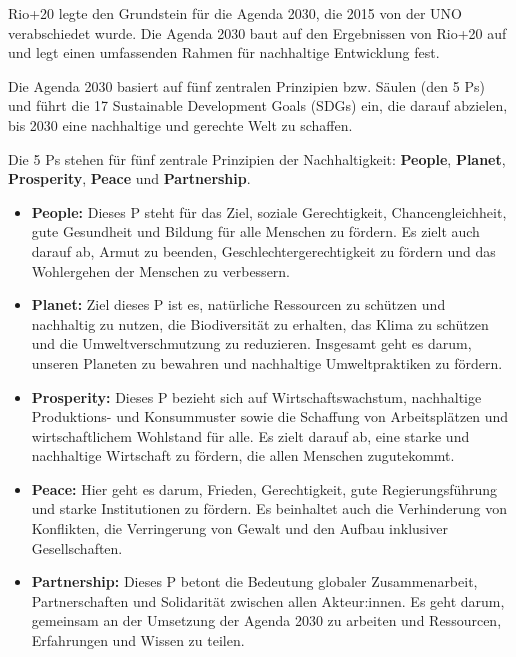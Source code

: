\documentclass[
  letterpaper,
  DIV=11,
  numbers=noendperiod]{scrartcl}
\begin{document}
Rio+20 legte den Grundstein für die Agenda 2030, die 2015 von der UNO
verabschiedet wurde. Die Agenda 2030 baut auf den Ergebnissen von Rio+20
auf und legt einen umfassenden Rahmen für nachhaltige Entwicklung fest.

Die Agenda 2030 basiert auf fünf zentralen Prinzipien bzw. Säulen (den 5
Ps) und führt die 17 Sustainable Development Goals (SDGs) ein, die
darauf abzielen, bis 2030 eine nachhaltige und gerechte Welt zu
schaffen.

\begin{tcolorbox}[enhanced jigsaw, opacitybacktitle=0.6, breakable, left=2mm, colback=white, leftrule=.75mm, colbacktitle=quarto-callout-note-color!10!white, bottomrule=.15mm, toprule=.15mm, titlerule=0mm, title=\textcolor{quarto-callout-note-color}{\faInfo}\hspace{0.5em}{Die 5 Ps der SDGs}, colframe=quarto-callout-note-color-frame, bottomtitle=1mm, opacityback=0, arc=.35mm, toptitle=1mm, rightrule=.15mm, coltitle=black]

Die 5 Ps stehen für fünf zentrale Prinzipien der Nachhaltigkeit:
\textbf{People}, \textbf{Planet}, \textbf{Prosperity}, \textbf{Peace}
und \textbf{Partnership}.

\begin{itemize}
\item
  \textbf{People:} Dieses P steht für das Ziel, soziale Gerechtigkeit,
  Chancengleichheit, gute Gesundheit und Bildung für alle Menschen zu
  fördern. Es zielt auch darauf ab, Armut zu beenden,
  Geschlechtergerechtigkeit zu fördern und das Wohlergehen der Menschen
  zu verbessern.
\item
  \textbf{Planet:} Ziel dieses P ist es, natürliche Ressourcen zu
  schützen und nachhaltig zu nutzen, die Biodiversität zu erhalten, das
  Klima zu schützen und die Umweltverschmutzung zu reduzieren. Insgesamt
  geht es darum, unseren Planeten zu bewahren und nachhaltige
  Umweltpraktiken zu fördern.
\item
  \textbf{Prosperity:} Dieses P bezieht sich auf Wirtschaftswachstum,
  nachhaltige Produktions- und Konsummuster sowie die Schaffung von
  Arbeitsplätzen und wirtschaftlichem Wohlstand für alle. Es zielt
  darauf ab, eine starke und nachhaltige Wirtschaft zu fördern, die
  allen Menschen zugutekommt.
\item
  \textbf{Peace:} Hier geht es darum, Frieden, Gerechtigkeit, gute
  Regierungsführung und starke Institutionen zu fördern. Es beinhaltet
  auch die Verhinderung von Konflikten, die Verringerung von Gewalt und
  den Aufbau inklusiver Gesellschaften.
\item
  \textbf{Partnership:} Dieses P betont die Bedeutung globaler
  Zusammenarbeit, Partnerschaften und Solidarität zwischen allen
  Akteur:innen. Es geht darum, gemeinsam an der Umsetzung der Agenda
  2030 zu arbeiten und Ressourcen, Erfahrungen und Wissen zu teilen.\\
\end{itemize}

\end{tcolorbox}
\end{document}

